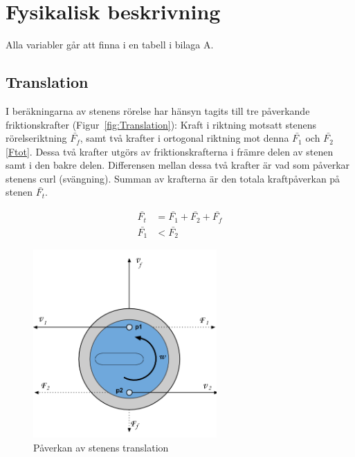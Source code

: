 \documentclass[11pt]{article} %
\begin{document}
\pagebreak

\section{Fysikalisk beskrivning} 

Alla variabler går att finna i en tabell i bilaga A.

\subsection{Translation}

I beräkningarna av stenens rörelse har hänsyn tagits till tre påverkande friktionskrafter (Figur~\ref{fig:Translation}): Kraft i riktning motsatt stenens rörelseriktning $\bar{F_f}$, samt två krafter i ortogonal riktning mot denna $\bar{F_1}$ och $\bar{F_2}$ \eqref{Ftot}. Dessa två krafter utgörs av friktionskrafterna i främre delen av stenen samt i den bakre delen. Differensen mellan dessa två krafter är vad som påverkar stenens curl (svängning). Summan av krafterna är den totala kraftpåverkan på stenen $\bar{F_t}$.

\begin{subequations}\label{Ftot}
 \begin{align}
 \bar{F_t}&=\bar{F_1}+\bar{F_2}+\bar{F_f}\\
 \bar{F_1}&<\bar{F_2}
 \end{align}
 \end{subequations}

\begin{figure}[ht!]
\centering
\includegraphics[width=70mm]{Translation.png}
\caption{Påverkan av stenens translation}
\label{fig:Translation}
\label{overflow}
\end{figure}
\end{document}
